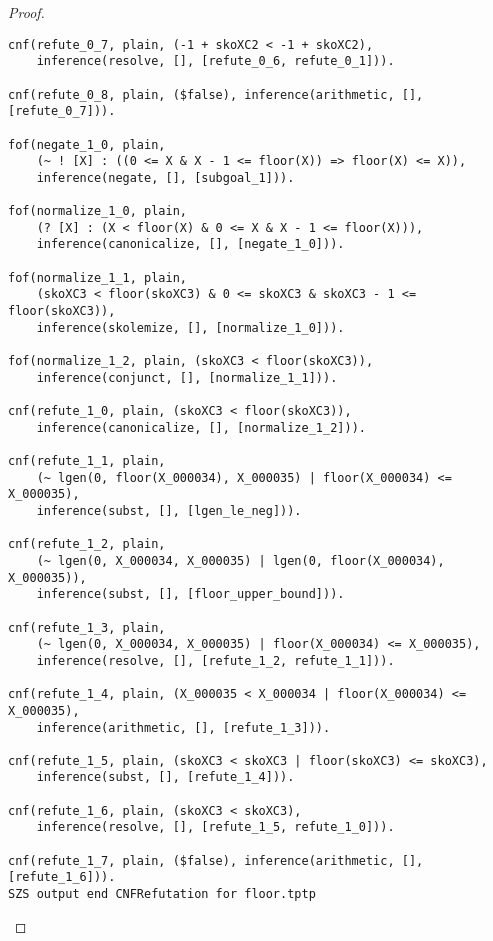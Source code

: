 \begin{proof}
\begin{verbatim}
cnf(refute_0_7, plain, (-1 + skoXC2 < -1 + skoXC2),
    inference(resolve, [], [refute_0_6, refute_0_1])).

cnf(refute_0_8, plain, ($false), inference(arithmetic, [], [refute_0_7])).

fof(negate_1_0, plain,
    (~ ! [X] : ((0 <= X & X - 1 <= floor(X)) => floor(X) <= X)),
    inference(negate, [], [subgoal_1])).

fof(normalize_1_0, plain,
    (? [X] : (X < floor(X) & 0 <= X & X - 1 <= floor(X))),
    inference(canonicalize, [], [negate_1_0])).

fof(normalize_1_1, plain,
    (skoXC3 < floor(skoXC3) & 0 <= skoXC3 & skoXC3 - 1 <= floor(skoXC3)),
    inference(skolemize, [], [normalize_1_0])).

fof(normalize_1_2, plain, (skoXC3 < floor(skoXC3)),
    inference(conjunct, [], [normalize_1_1])).

cnf(refute_1_0, plain, (skoXC3 < floor(skoXC3)),
    inference(canonicalize, [], [normalize_1_2])).

cnf(refute_1_1, plain,
    (~ lgen(0, floor(X_000034), X_000035) | floor(X_000034) <= X_000035),
    inference(subst, [], [lgen_le_neg])).

cnf(refute_1_2, plain,
    (~ lgen(0, X_000034, X_000035) | lgen(0, floor(X_000034), X_000035)),
    inference(subst, [], [floor_upper_bound])).

cnf(refute_1_3, plain,
    (~ lgen(0, X_000034, X_000035) | floor(X_000034) <= X_000035),
    inference(resolve, [], [refute_1_2, refute_1_1])).

cnf(refute_1_4, plain, (X_000035 < X_000034 | floor(X_000034) <= X_000035),
    inference(arithmetic, [], [refute_1_3])).

cnf(refute_1_5, plain, (skoXC3 < skoXC3 | floor(skoXC3) <= skoXC3),
    inference(subst, [], [refute_1_4])).

cnf(refute_1_6, plain, (skoXC3 < skoXC3),
    inference(resolve, [], [refute_1_5, refute_1_0])).

cnf(refute_1_7, plain, ($false), inference(arithmetic, [], [refute_1_6])).
SZS output end CNFRefutation for floor.tptp
\end{verbatim}
\fi
\end{proof}

